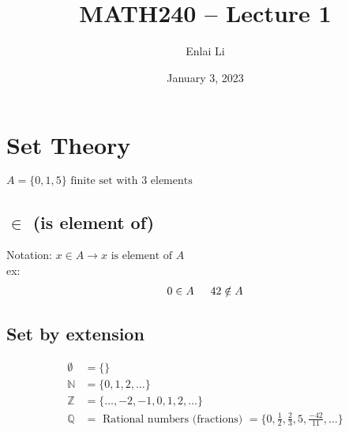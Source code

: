\documentclass{article}
\author{Enlai Li}
\title{MATH240 -- Lecture 1}
\date{January 3, 2023}
\begin{document}
\maketitle
\section{Set Theory}
$A = \{0, 1, 5\} \text{ finite set with 3 elements}$

\subsection{$\in$ (is element of)}
Notation: $x \in A \rightarrow x \text{ is element of } A$ \\
ex:
\begin{align*}
    0 \in A \text{\indent } 42 \notin A
\end{align*}

\subsection{Set by extension}
\begin{align*}
    \emptyset  & = \{\}                                                                  \\
    \mathbb{N} & = \{0,1,2,\ldots\}                                                      \\
    \mathbb{Z} & = \{\ldots,-2,-1,0,1,2,\ldots\}                                         \\
    \mathbb{Q} & = \text{ Rational numbers (fractions) } = \{0, \frac{1}{2}, \frac{2}{3}
    , 5, \frac{-42}{11}, \ldots\}
\end{align*}
\end{document}
